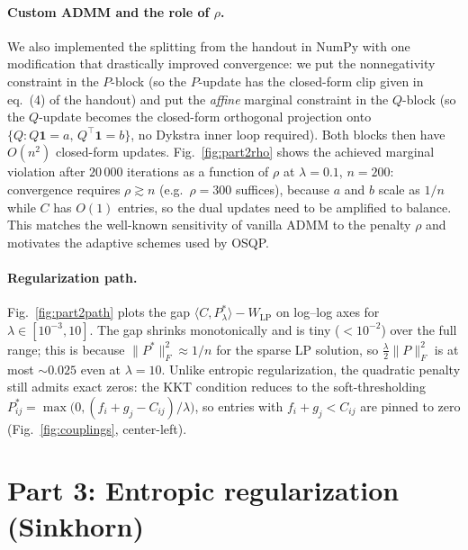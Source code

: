 \documentclass{article}
\begin{document}
\paragraph{Custom ADMM and the role of $\rho$.}
We also implemented the splitting from the handout in NumPy with one
modification that drastically improved convergence: we put the
nonnegativity constraint in the $P$-block (so the $P$-update has the
closed-form clip given in eq.~(4) of the handout) and put the
\emph{affine} marginal constraint in the $Q$-block (so the $Q$-update
becomes the closed-form orthogonal projection onto
$\{Q\!:\!Q\mathbf 1\!=\!a,\,Q^{\!\top}\!\mathbf 1\!=\!b\}$, no Dykstra
inner loop required).  Both blocks then have $O(n^2)$ closed-form updates.
Fig.~\ref{fig:part2rho} shows the achieved marginal violation after
$20\,000$ iterations as a function of $\rho$ at $\lambda\!=\!0.1$,
$n\!=\!200$: convergence requires $\rho \gtrsim n$ (e.g.\ $\rho\!=\!300$
suffices), because $a$ and $b$ scale as $1/n$ while $C$ has $O(1)$
entries, so the dual updates need to be amplified to balance.
This matches the well-known sensitivity of vanilla ADMM to the
penalty $\rho$ and motivates the adaptive schemes used by OSQP.

\paragraph{Regularization path.}
Fig.~\ref{fig:part2path} plots the gap $\langle C,P^*_\lambda\rangle\!-\!W_{\mathrm{LP}}$
on log--log axes for $\lambda\!\in\![10^{-3},10]$.  The gap shrinks
monotonically and is tiny ($<\!10^{-2}$) over the full range; this is
because $\|P^*\|_F^2 \approx 1/n$ for the sparse LP solution, so
$\tfrac\lambda 2\|P\|_F^2$ is at most $\sim 0.025$ even at $\lambda\!=\!10$.
Unlike entropic regularization, the quadratic penalty still admits
exact zeros: the KKT condition reduces to the soft-thresholding
$P^*_{ij}\!=\!\max\bigl(0, (f_i+g_j-C_{ij})/\lambda\bigr)$, so entries
with $f_i+g_j<C_{ij}$ are pinned to zero (Fig.~\ref{fig:couplings},
center-left).

\section{Part 3: Entropic regularization (Sinkhorn)}
\label{sec:part3}
\end{document}
